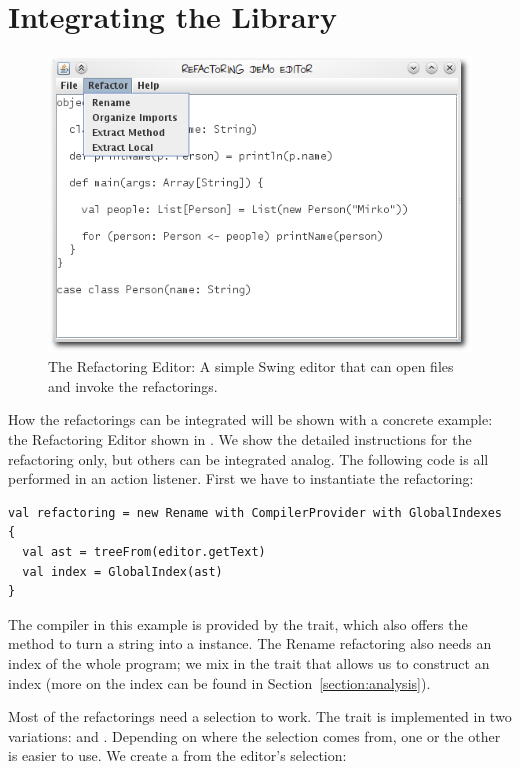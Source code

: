 \documentclass[10pt,a4paper,oneside]{scrreprt}
\begin{document}
\section{Integrating the Library}

\begin{figure}
  \centering
  \includegraphics[width=0.7\linewidth]{refactoring-editor.png}
  \caption{The Refactoring Editor: A simple Swing editor that can open files and invoke the refactorings.}
  \label{figure:refactoring-editor}
\end{figure}

How the refactorings can be integrated will be shown with a concrete example: the Refactoring Editor shown in . We show the detailed instructions for the  refactoring only, but others can be integrated analog. The following code is all performed in an action listener. First we have to instantiate the refactoring:

\begin{lstlisting}
val refactoring = new Rename with CompilerProvider with GlobalIndexes {
  val ast = treeFrom(editor.getText)
  val index = GlobalIndex(ast)
}
\end{lstlisting}

The compiler in this example is provided by the  trait, which also offers the  method to turn a string into a  instance. The Rename refactoring also needs an index of the whole program; we mix in the  trait that allows us to construct an index (more on the index can be found in Section~\vref{section:analysis}).

Most of the refactorings need a selection to work. The  trait is implemented in two variations:  and . Depending on where the selection comes from, one or the other is easier to use. We create a  from the editor's selection:
\end{document}

